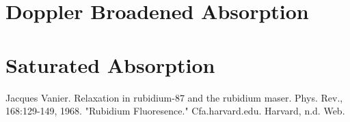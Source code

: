 \documentclass[paper=a4, fontsize=11pt]{scrartcl} %
\numberwithin{equation}{section}
\numberwithin{figure}{section}
\numberwithin{table}{section}
\begin{document}
\section{Doppler Broadened Absorption}

\section{Saturated Absorption}



\begin{thebibliography}{99}
Jacques Vanier. Relaxation in rubidium-87 and the
  rubidium maser. Phys. Rev., 168:129-149, 1968.
"Rubidium Fluoresence." Cfa.harvard.edu. Harvard, n.d. Web.
\end{thebibliography}
\end{document}

